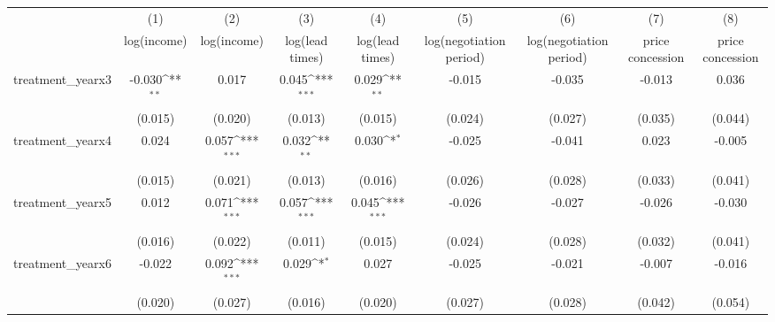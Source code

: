 {
\def\sym#1{\ifmmode^{#1}\else\(^{#1}\)\fi}
\begin{tabular}{l*{8}{c}}
\toprule
            &\multicolumn{1}{c}{(1)}&\multicolumn{1}{c}{(2)}&\multicolumn{1}{c}{(3)}&\multicolumn{1}{c}{(4)}&\multicolumn{1}{c}{(5)}&\multicolumn{1}{c}{(6)}&\multicolumn{1}{c}{(7)}&\multicolumn{1}{c}{(8)}\\
            &\multicolumn{1}{c}{log(income)}&\multicolumn{1}{c}{log(income)}&\multicolumn{1}{c}{log(lead times)}&\multicolumn{1}{c}{log(lead times)}&\multicolumn{1}{c}{log(negotiation period)}&\multicolumn{1}{c}{log(negotiation period)}&\multicolumn{1}{c}{price concession}&\multicolumn{1}{c}{price concession}\\
\midrule
treatment\_yearx3&      -0.030\sym{**} &       0.017         &       0.045\sym{***}&       0.029\sym{**} &      -0.015         &      -0.035         &      -0.013         &       0.036         \\
            &     (0.015)         &     (0.020)         &     (0.013)         &     (0.015)         &     (0.024)         &     (0.027)         &     (0.035)         &     (0.044)         \\
\addlinespace
treatment\_yearx4&       0.024         &       0.057\sym{***}&       0.032\sym{**} &       0.030\sym{*}  &      -0.025         &      -0.041         &       0.023         &      -0.005         \\
            &     (0.015)         &     (0.021)         &     (0.013)         &     (0.016)         &     (0.026)         &     (0.028)         &     (0.033)         &     (0.041)         \\
\addlinespace
treatment\_yearx5&       0.012         &       0.071\sym{***}&       0.057\sym{***}&       0.045\sym{***}&      -0.026         &      -0.027         &      -0.026         &      -0.030         \\
            &     (0.016)         &     (0.022)         &     (0.011)         &     (0.015)         &     (0.024)         &     (0.028)         &     (0.032)         &     (0.041)         \\
\addlinespace
treatment\_yearx6&      -0.022         &       0.092\sym{***}&       0.029\sym{*}  &       0.027         &      -0.025         &      -0.021         &      -0.007         &      -0.016         \\
            &     (0.020)         &     (0.027)         &     (0.016)         &     (0.020)         &     (0.027)         &     (0.028)         &     (0.042)         &     (0.054)         \\

\end{tabular}}
